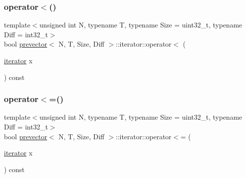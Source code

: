 \mbox{\label{classprevector_1_1iterator_a21c9ead8f23f691204d0e1b58c8de636}} 
\subsubsection{\texorpdfstring{operator$<$()}{operator<()}}
{\footnotesize\ttfamily template$<$unsigned int N, typename T, typename Size = uint32\+\_\+t, typename Diff = int32\+\_\+t$>$ \\
bool \mbox{\hyperlink{classprevector}{prevector}}$<$ N, T, Size, Diff $>$\+::iterator\+::operator$<$ (\begin{DoxyParamCaption}\item[{\mbox{\hyperlink{classprevector_1_1iterator}{iterator}}}]{x }\end{DoxyParamCaption}) const\hspace{0.3cm}{\ttfamily [inline]}}

\mbox{\label{classprevector_1_1iterator_a71bcf1e1019bf7329a48791ba6a2f680}} 
\subsubsection{\texorpdfstring{operator$<$=()}{operator<=()}}
{\footnotesize\ttfamily template$<$unsigned int N, typename T, typename Size = uint32\+\_\+t, typename Diff = int32\+\_\+t$>$ \\
bool \mbox{\hyperlink{classprevector}{prevector}}$<$ N, T, Size, Diff $>$\+::iterator\+::operator$<$= (\begin{DoxyParamCaption}\item[{\mbox{\hyperlink{classprevector_1_1iterator}{iterator}}}]{x }\end{DoxyParamCaption}) const\hspace{0.3cm}{\ttfamily [inline]}}

\mbox{\label{classprevector_1_1iterator_a2c296e13ae8e71c99d9efa6af596fcf8}} 
